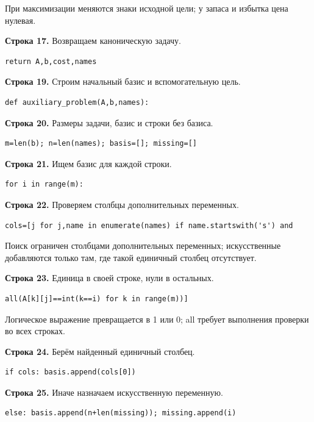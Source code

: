 \documentclass[12pt,a4paper]{article}
\begin{document}
При максимизации меняются знаки исходной цели; у запаса и избытка цена нулевая.
\par\textbf{Строка 17.} Возвращаем каноническую задачу.
\begin{Verbatim}[fontsize=\small,breaklines=true,breakanywhere=true]
    return A,b,cost,names
\end{Verbatim}
\par\textbf{Строка 19.} Строим начальный базис и вспомогательную цель.
\begin{Verbatim}[fontsize=\small,breaklines=true,breakanywhere=true]
def auxiliary_problem(A,b,names):
\end{Verbatim}
\par\textbf{Строка 20.} Размеры задачи, базис и строки без базиса.
\begin{Verbatim}[fontsize=\small,breaklines=true,breakanywhere=true]
    m=len(b); n=len(names); basis=[]; missing=[]
\end{Verbatim}
\par\textbf{Строка 21.} Ищем базис для каждой строки.
\begin{Verbatim}[fontsize=\small,breaklines=true,breakanywhere=true]
    for i in range(m):
\end{Verbatim}
\par\textbf{Строка 22.} Проверяем столбцы дополнительных переменных.
\begin{Verbatim}[fontsize=\small,breaklines=true,breakanywhere=true]
        cols=[j for j,name in enumerate(names) if name.startswith('s') and
\end{Verbatim}
Поиск ограничен столбцами дополнительных переменных; искусственные добавляются только там, где такой единичный столбец отсутствует.
\par\textbf{Строка 23.} Единица в своей строке, нули в остальных.
\begin{Verbatim}[fontsize=\small,breaklines=true,breakanywhere=true]
              all(A[k][j]==int(k==i) for k in range(m))]
\end{Verbatim}
Логическое выражение превращается в 1 или 0; all требует выполнения проверки во всех строках.
\par\textbf{Строка 24.} Берём найденный единичный столбец.
\begin{Verbatim}[fontsize=\small,breaklines=true,breakanywhere=true]
        if cols: basis.append(cols[0])
\end{Verbatim}
\par\textbf{Строка 25.} Иначе назначаем искусственную переменную.
\begin{Verbatim}[fontsize=\small,breaklines=true,breakanywhere=true]
        else: basis.append(n+len(missing)); missing.append(i)
\end{Verbatim}
\end{document}
